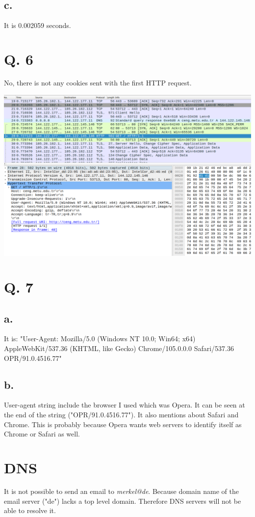 \documentclass[11pt]{article}
\begin{document}
	\subsection*{c.}
	It is 0.002059 seconds.
	
	\section*{Q. 6}
	No, there is not any cookies sent with the first HTTP request.
	\begin{center}
		\includegraphics[scale=0.25]{firsthttp}
	\end{center}
	\section*{Q. 7}
	\subsection*{a.}
	It is: "User-Agent: Mozilla/5.0 (Windows NT 10.0; Win64; x64) AppleWebKit/537.36 (KHTML, like Gecko) Chrome/105.0.0.0 Safari/537.36 OPR/91.0.4516.77"
	\subsection*{b.}
	User-agent string include the browser I used which was Opera. It can be seen at the end of the string ("OPR/91.0.4516.77"). It also mentions about Safari and Chrome. This is probably because Opera wants web servers to identify itself as Chrome or Safari as well.

	\section*{DNS}
	It is not possible to send an email to \emph{merkel@de}. Because domain name of the email server ("de") lacks a top level domain. Therefore DNS servers will not be able to resolve it. 
\end{document}
